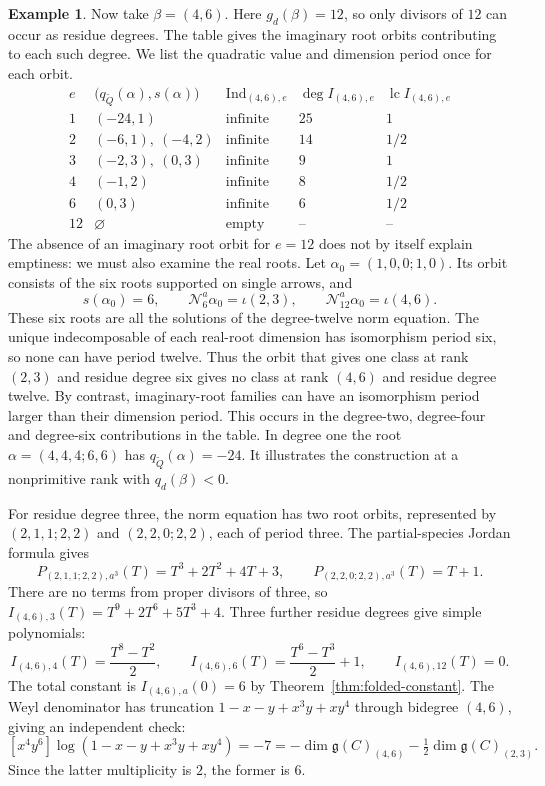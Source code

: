 \documentclass[11pt, reqno]{amsart}
\numberwithin{equation}{section}
\theoremstyle{definition}
\newtheorem{example}[theorem]{Example}
\theoremstyle{remark}
\newcommand{\op}[1]{\operatorname{#1}}
\newcommand{\mc}[1]{\mathcal{#1}}
\newcommand{\Ind}{\op{Ind}}
\newcommand{\Qbar}{\widetilde Q}
\begin{document}
\begin{example}\label{ex:doubled-indefinite}
Now take $\beta=(4,6)$.
Here $g_d(\beta)=12$, so only divisors of $12$ can occur as residue
degrees. The table gives the imaginary root orbits contributing to
each such degree. We list the quadratic value and dimension period
once for each orbit.
\[
\begin{array}{c|c|c|c|c}
 e&\bigl(q_{\Qbar}(\alpha),s(\alpha)\bigr)&
 \Ind_{(4,6),e}&\deg I_{(4,6),e}&\op{lc} I_{(4,6),e}\\\hline
 1&(-24,1)&\text{infinite}&25&1\\
 2&(-6,1),\ (-4,2)&\text{infinite}&14&1/2\\
 3&(-2,3),\ (0,3)&\text{infinite}&9&1\\
 4&(-1,2)&\text{infinite}&8&1/2\\
 6&(0,3)&\text{infinite}&6&1/2\\
 12&\varnothing&\text{empty}&\text{--}&\text{--}
\end{array}
\]
The absence of an imaginary root orbit for $e=12$ does not
by itself explain emptiness: we must also examine the real roots.
Let $\alpha_0=(1,0,0;1,0)$. Its orbit consists of the six roots
supported on single arrows, and
\[ s(\alpha_0)=6,\qquad \mc N_6^a\alpha_0=\iota(2,3),\qquad \mc N_{12}^a\alpha_0=\iota(4,6). \]
These six roots are all the solutions of the degree-twelve norm
equation. The unique indecomposable of each real-root dimension has
isomorphism period six, so none can have period twelve. Thus the
orbit that gives one class at rank $(2,3)$ and residue degree six
gives no class at rank $(4,6)$ and residue degree twelve.
By contrast, imaginary-root families can have an isomorphism period
larger than their dimension period. This occurs in the degree-two,
degree-four and degree-six contributions in the table.
In degree one the root $\alpha=(4,4,4;6,6)$ has
$q_{\Qbar}(\alpha)=-24$. It illustrates the construction at a
nonprimitive rank with $q_d(\beta)<0$.


For residue degree three, the norm equation has two root orbits,
represented by $(2,1,1;2,2)$ and $(2,2,0;2,2)$, each of period three.
The partial-species Jordan formula gives
\[ P_{(2,1,1;2,2),a^3}(T)=T^3+2T^2+4T+3, \qquad P_{(2,2,0;2,2),a^3}(T)=T+1.\]
There are no terms from proper divisors of three, so
$I_{(4,6),3}(T)=T^9+2T^6+5T^3+4$.
Three further residue degrees give simple polynomials:
\[ I_{(4,6),4}(T)=\frac{T^8-T^2}{2},\qquad I_{(4,6),6}(T)=\frac{T^6-T^3}{2}+1,\qquad I_{(4,6),12}(T)=0. \]
The total constant is $I_{(4,6),a}(0)=6$ by
Theorem~\ref{thm:folded-constant}. The Weyl denominator has truncation
$1-x-y+x^3y+xy^4$ through bidegree $(4,6)$, giving an independent check:
\[
[x^4y^6]\log(1-x-y+x^3y+xy^4)
=-7=-\dim\mathfrak g(C)_{(4,6)}-\tfrac12\dim\mathfrak g(C)_{(2,3)}.
\]
Since the latter multiplicity is $2$, the former is $6$.


\end{example}
\end{document}
